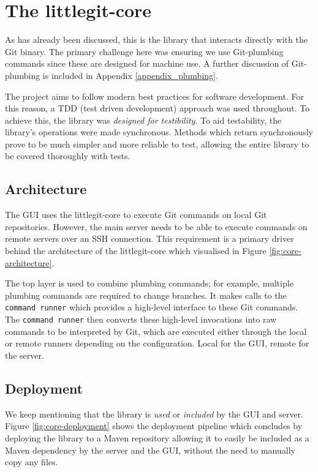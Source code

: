 \section{The littlegit-core}

As has already been discussed, this is the library that interacts directly with the Git binary. The primary challenge here was ensuring we use Git-plumbing commands since these are designed for machine use. A further discussion of Git-plumbing is included in Appendix \ref{appendix_plumbing}.

The project aims to follow modern best practices for software development. For this reason, a TDD (test driven development) approach was used throughout. To achieve this, the library was \emph{designed for testibility}. To aid testability, the library's operations were made synchronous.  Methods which return synchronously prove to be much simpler and more reliable to test, allowing the entire library to be covered thoroughly with tests.

\subsection{Architecture}\label{sec:core-architecture}

The GUI uses the littlegit-core to execute Git commands on local Git repositories. However, the main server needs to be able to execute commands on remote servers over an SSH connection. This requirement is a primary driver behind the architecture of the littlegit-core which visualised in Figure \ref{fig:core-architecture}. 

The top layer is used to combine plumbing commands; for example, multiple plumbing commands are required to change branches. It makes calls to the \texttt{command runner} which provides a high-level interface to these Git commands. The  \texttt{command runner} then converts these high-level invocations into raw commands to be interpreted by Git, which are executed either through the local or remote runners depending on the configuration. Local for the GUI, remote for the server.



\subsection{Deployment}

We keep mentioning that the library is \emph{used} or \emph{included} by the GUI and server.  Figure \ref{fig:core-deployment} shows the deployment pipeline which concludes by deploying the library to a Maven \cite{maven} repository allowing it to easily be included as a Maven dependency by the server and the GUI, without the need to manually copy any files.

